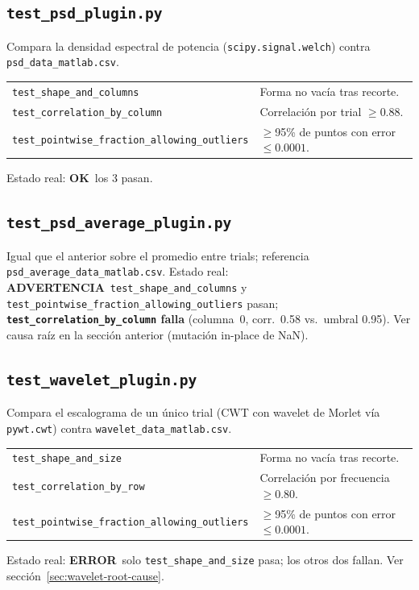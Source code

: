 \documentclass[11pt,a4paper]{article}
\newcommand{\okmark}{\textcolor{ok}{\textbf{OK}}}
\newcommand{\errmark}{\textcolor{critico}{\textbf{ERROR}}}
\newcommand{\warnmark}{\textcolor{advertencia}{\textbf{ADVERTENCIA}}}
\begin{document}
\subsection{\texttt{test\_\allowbreak psd\_\allowbreak plugin.py}}
Compara la densidad espectral de potencia (\texttt{scipy.signal.welch}) contra \texttt{psd\_\allowbreak data\_\allowbreak matlab.csv}.
\begin{center}
\begin{tabular}{ll}
\toprule
\texttt{test\_\allowbreak shape\_\allowbreak and\_\allowbreak columns} & Forma no vacía tras recorte. \\
\texttt{test\_\allowbreak correlation\_\allowbreak by\_\allowbreak column} & Correlación por trial $\geq 0.88$. \\
\texttt{test\_\allowbreak pointwise\_\allowbreak fraction\_\allowbreak allowing\_\allowbreak outliers} & $\geq$95\% de puntos con error $\leq 0.0001$. \\
\bottomrule
\end{tabular}
\end{center}
Estado real: \okmark\ los 3 pasan.

\subsection{\texttt{test\_\allowbreak psd\_\allowbreak average\_\allowbreak plugin.py}}
Igual que el anterior sobre el promedio entre trials; referencia \texttt{psd\_\allowbreak average\_\allowbreak data\_\allowbreak matlab.csv}.
Estado real: \warnmark\ \texttt{test\_\allowbreak shape\_\allowbreak and\_\allowbreak columns} y \texttt{test\_\allowbreak pointwise\_\allowbreak fraction\_\allowbreak allowing\_\allowbreak outliers}
pasan; \textbf{\texttt{test\_\allowbreak correlation\_\allowbreak by\_\allowbreak column} falla} (columna~0, corr.\ 0.58 vs.\ umbral 0.95). Ver
causa raíz en la sección anterior (mutación in-place de NaN).

\subsection{\texttt{test\_\allowbreak wavelet\_\allowbreak plugin.py}}
Compara el escalograma de un único trial (CWT con wavelet de Morlet vía \texttt{pywt.cwt}) contra
\texttt{wavelet\_\allowbreak data\_\allowbreak matlab.csv}.
\begin{center}
\begin{tabular}{ll}
\toprule
\texttt{test\_\allowbreak shape\_\allowbreak and\_\allowbreak size} & Forma no vacía tras recorte. \\
\texttt{test\_\allowbreak correlation\_\allowbreak by\_\allowbreak row} & Correlación por frecuencia $\geq 0.80$. \\
\texttt{test\_\allowbreak pointwise\_\allowbreak fraction\_\allowbreak allowing\_\allowbreak outliers} & $\geq$95\% de puntos con error $\leq 0.0001$. \\
\bottomrule
\end{tabular}
\end{center}
Estado real: \errmark\ solo \texttt{test\_\allowbreak shape\_\allowbreak and\_\allowbreak size} pasa; los otros dos fallan. Ver
sección~\ref{sec:wavelet-root-cause}.
\end{document}
